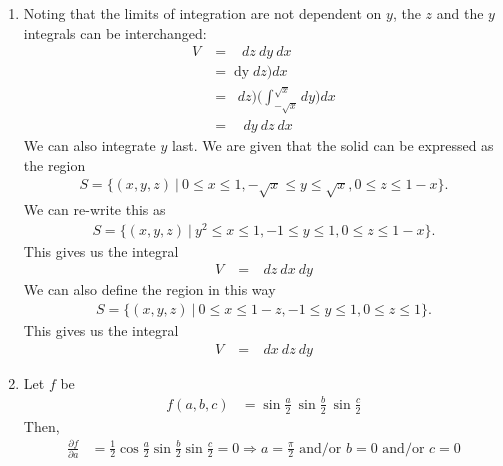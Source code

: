 \documentclass{article}
\begin{document}
\begin{enumerate}
\item %
Noting that the limits of integration are not dependent on $y$, the $z$ and the $y$ integrals can be interchanged:
\begin{align*}
  V &= \mathop{\int_{0}^{1} \!\! \int_{-\sqrt{x}}^{\sqrt{x}} \! \int_0^{1-x} } dz\ dy\ dx \\
   &= \mathop{\int_{0}^{1} \Bigg( \int_{-\sqrt{x}}^{\sqrt{x}} dy \Bigg) \Bigg( \int_0^{1-x} } dz\Bigg) dx \\
   &= \mathop{\int_{0}^{1}  \Bigg( \int_0^{1-x} } dz\Bigg) \Bigg( \int_{-\sqrt{x}}^{\sqrt{x}} dy \Bigg)dx \\
   &= \mathop{\int_{0}^{1} \!\! \int_0^{1-x} \!\! \int_{-\sqrt{x}}^{\sqrt{x}}} dy\ dz\ dx 
\end{align*}
We can also integrate $y$ last. We are given that the solid can be expressed as the region 
\begin{align*}
  S = \{(x,y,z)\ |\  0 \le x \le 1, -\sqrt{x} \le y \le \sqrt{x}, 0 \le z \le 1-x \}.
\end{align*}
We can re-write this as
\begin{align*}
  S = \{(x,y,z)\ |\  y^2 \le x \le 1, -1 \le y \le 1, 0 \le z \le 1-x \}.
\end{align*}
This gives us the integral
\begin{align*}
  V &= \mathop{\int_{-1}^{1} \! \int_{y^2}^{1} \! \int_0^{1-x} } dz\ dx\ dy
\end{align*}
We can also define the region in this way 
\begin{align*}
  S = \{(x,y,z)\ |\  0 \le x \le 1-z, -1 \le y \le 1, 0 \le z \le 1 \}.
\end{align*}
This gives us the integral
\begin{align*}
  V &= \mathop{\int_{-1}^{1} \! \int_{0}^{1} \! \int_0^{1-z} } dx\ dz\ dy
\end{align*}
\item %
Let $f$ be
\begin{align*}
  f(a,b,c) &=  \sin\frac{a}{2} \ \sin\frac{b}{2} \ \sin\frac{c}{2}
\end{align*}
Then,
\begin{align*}
  \frac{\partial f}{\partial a} &=  \frac{1}{2}\cos\frac{a}{2}  \sin\frac{b}{2}  \sin\frac{c}{2} =0 \Rightarrow a=\frac{\pi}{2} \text{ and/or } b=0\text{ and/or } c=0\\

\end{align*}
\end{enumerate}
\end{document}
